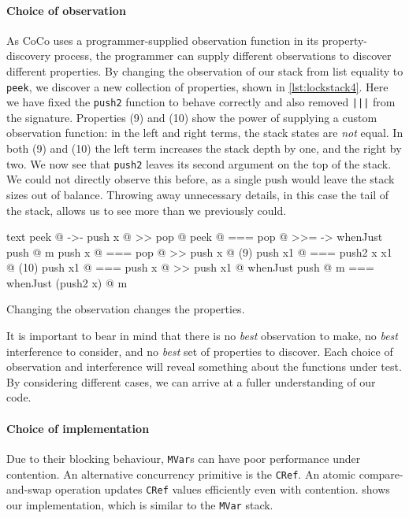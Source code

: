 \paragraph{Choice of observation}
As CoCo uses a programmer-supplied observation function in its
property-discovery process, the programmer can supply different
observations to discover different properties.  By changing the
observation of our stack from list equality to \verb|peek|, we
discover a new collection of properties, shown in
\cref{lst:lockstack4}.  Here we have fixed the \verb|push2| function
to behave correctly and also removed \verb#|||# from the signature.
Properties (9) and (10) show the power of supplying a custom
observation function: in the left and right terms, the stack states
are \emph{not} equal.  In both (9) and (10) the left term increases
the stack depth by one, and the right by two.  We now see that
\verb|push2| leaves its second argument on the top of the stack.  We
could not directly observe this before, as a single push would leave
the stack sizes out of balance.  Throwing away unnecessary details, in
this case the tail of the stack, allows us to see more than we
previously could.

\begin{listing}
\centering
\begin{cminted}{text}
           peek @  ->-  push x @ >> pop @
           peek @  ===  pop @ >>= \m -> whenJust push @ m
         push x @  ===  pop @ >> push x @
(9)     push x1 @  ===  push2 x x1 @
(10)    push x1 @  ===  push x @ >> push x1 @
whenJust push @ m  ===  whenJust (push2 x) @ m
\end{cminted}
\caption{Changing the observation changes the properties.}\label{lst:lockstack4}
\end{listing}

It is important to bear in mind that there is no \emph{best}
observation to make, no \emph{best} interference to consider, and no
\emph{best} set of properties to discover.  Each choice of observation
and interference will reveal something about the functions under test.
By considering different cases, we can arrive at a fuller
understanding of our code.

\paragraph{Choice of implementation}
Due to their blocking behaviour, \verb|MVar|s can have poor
performance under contention.  An alternative concurrency primitive is
the \verb|CRef|.  An atomic compare-and-swap operation updates
\verb|CRef| values efficiently even with contention.
 shows our implementation, which is similar to the
\verb|MVar| stack.


